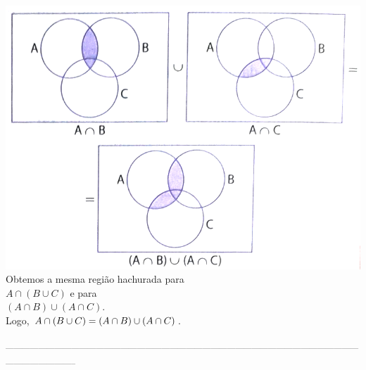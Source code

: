 \documentclass[a4paper,14pt]{article}
\begin{document}
\begin{multicols}{2}
\begin{enumerate}[I.]
    			\includegraphics[width=1.1\linewidth]{"6FMA54_imagens/imagem2"}
    			Obtemos a mesma região hachurada para \\
    			$A \cap (B \cup C)$ e para \\ $(A \cap B) \cup (A \cap C)$. \\ Logo, $A \cap (B \cup C) = \\ (A \cap B) \cup (A \cap C)$.
    		\end{enumerate}
    \end{multicols}
    \noindent\textsubscript{-----------------------------------------------------------------------------------------------------------------------------------------------------------}
\end{document}

